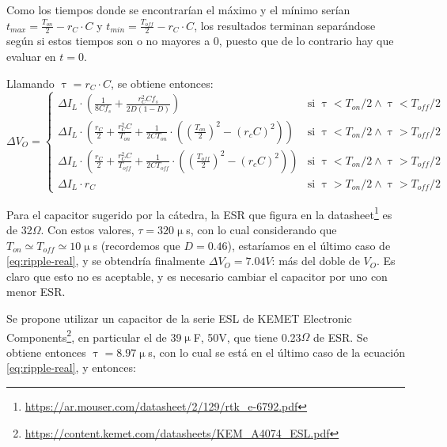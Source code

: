 \documentclass[e4_tp1_main.tex]{subfiles}
\begin{document}
Como los tiempos donde se encontrar\'ian el m\'aximo y el m\'inimo ser\'ian $t_{max} = \frac{T_{on}}{2} - r_C \cdot C$ y $t_{min} = \frac{T_{off}}{2} - r_C \cdot C$, los resultados terminan separ\'andose seg\'un si estos tiempos son o no mayores a 0, puesto que de lo contrario hay que evaluar en $t=0$. 

Llamando $\uptau = r_C \cdot C$, se obtiene entonces:
\begin{equation}
	\Delta V_O =
	\begin{cases} 
		
		\Delta I_L \cdot \left(
			\frac{1}{8Cf_s} + \frac{r_C^2 C f_s}{2D(1-D)}
		\right) 
		& \text{si }  \uptau < T_{on}/2 \wedge \uptau < T_{off}/2 \\
		
		\Delta I_L \cdot \left(
		\frac{r_C}{2} + \frac{r_C^2 C}{T_{on}} + \frac{1}{2CT_{on}} 
		\cdot \left(
			\left( \frac{T_{on}}{2} \right)^2 - (r_c C)^2
		\right)
		\right) 
		& \text{si }  \uptau < T_{on}/2 \wedge \uptau > T_{off}/2\\
		
		\Delta I_L \cdot \left(
		\frac{r_C}{2} + \frac{r_C^2 C}{T_{off}} + \frac{1}{2CT_{off}} 
		\cdot \left(
		\left( \frac{T_{off}}{2} \right)^2 - (r_c C)^2
		\right)
		\right) 
		& \text{si }  
		\uptau < T_{on}/2 \wedge \uptau > T_{off}/2\\
		
		\Delta I_L \cdot r_C & \text{si } \uptau > T_{on}/2 \wedge \uptau > T_{off}/2
		
	\end{cases}
	\label{eq:ripple-real}
\end{equation}

Para el capacitor sugerido por la c\'atedra, la ESR que figura en la datasheet\footnote{ 
	\url{https://ar.mouser.com/datasheet/2/129/rtk_e-6792.pdf}
} es de 32$\Omega$. Con estos valores, $\tau = 320\upmu$s, con lo cual considerando que $T_{on} \simeq T_{off} \simeq 10\upmu$s (recordemos que $D = 0.46$), estar\'iamos en el \'ultimo caso de \ref{eq:ripple-real}, y se obtendr\'ia finalmente $\Delta V_O = 7.04V$: m\'as del doble de $V_O$. Es claro que esto no es aceptable, y es necesario cambiar el capacitor por uno con menor ESR.

Se propone utilizar un capacitor de la serie ESL de KEMET Electronic Components\footnote{
	\url{https://content.kemet.com/datasheets/KEM_A4074_ESL.pdf}
}, en particular el de 39$\upmu$F, 50V, que tiene 0.23$\Omega$ de ESR. Se obtiene entonces $\uptau = 8.97 \upmu$s, con lo cual se est\'a en el \'ultimo caso de la ecuaci\'on \ref{eq:ripple-real}, y entonces:
\end{document}
